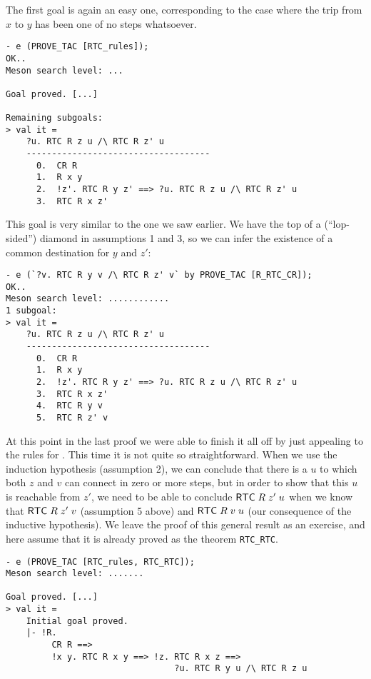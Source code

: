 \documentclass[12pt]{article}
\begin{document}
The first goal is again an easy one, corresponding to the case where
the trip from $x$ to $y$ has been one of no steps whatsoever.
\begin{session}\begin{verbatim}
- e (PROVE_TAC [RTC_rules]);
OK..
Meson search level: ...

Goal proved. [...]

Remaining subgoals:
> val it =
    ?u. RTC R z u /\ RTC R z' u
    ------------------------------------
      0.  CR R
      1.  R x y
      2.  !z'. RTC R y z' ==> ?u. RTC R z u /\ RTC R z' u
      3.  RTC R x z'
\end{verbatim}\end{session}
This goal is very similar to the one we saw earlier.  We have the top
of a (``lop-sided'') diamond in assumptions 1 and 3, so we can infer
the existence of a common destination for $y$ and $z'$:
\begin{session}\begin{verbatim}
- e (`?v. RTC R y v /\ RTC R z' v` by PROVE_TAC [R_RTC_CR]);
OK..
Meson search level: ............
1 subgoal:
> val it =
    ?u. RTC R z u /\ RTC R z' u
    ------------------------------------
      0.  CR R
      1.  R x y
      2.  !z'. RTC R y z' ==> ?u. RTC R z u /\ RTC R z' u
      3.  RTC R x z'
      4.  RTC R y v
      5.  RTC R z' v
\end{verbatim}\end{session}
    At this point in the last proof we were able to finish it all off
    by just appealing to the rules for .  This time it is not
    quite so straightforward.  When we use the induction hypothesis
    (assumption 2), we can conclude that there is a $u$ to which both
    $z$ and $v$ can connect in zero or more steps, but in order to
    show that this $u$ is reachable from $z'$, we need to be able to
    conclude ${\sf RTC}\;R\;z'\;u$ when we know that
    ${\sf RTC}\;R\;z'\;v$ (assumption 5 above) and
    ${\sf RTC}\;R\;v\;u$ (our consequence of the inductive
    hypothesis).  We leave the proof of this general result as an
    exercise, and here assume that it is already proved as the theorem
    \texttt{RTC\_RTC}.
\begin{session}\begin{verbatim}
- e (PROVE_TAC [RTC_rules, RTC_RTC]);
Meson search level: .......

Goal proved. [...]
> val it =
    Initial goal proved.
    |- !R.
         CR R ==>
         !x y. RTC R x y ==> !z. RTC R x z ==>
                                 ?u. RTC R y u /\ RTC R z u
\end{verbatim}\end{session}
\end{document}
